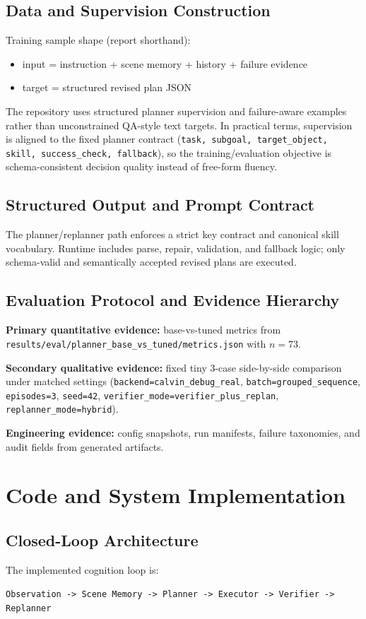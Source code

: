 \documentclass{article}
\begin{document}
\subsection{Data and Supervision Construction}
Training sample shape (report shorthand):
\begin{itemize}[leftmargin=*]
  \item input = instruction + scene memory + history + failure evidence
  \item target = structured revised plan JSON
\end{itemize}
The repository uses structured planner supervision and failure-aware examples rather than unconstrained QA-style text targets. In practical terms, supervision is aligned to the fixed planner contract (\texttt{task, subgoal, target\_object, skill, success\_check, fallback}), so the training/evaluation objective is schema-consistent decision quality instead of free-form fluency.

\subsection{Structured Output and Prompt Contract}
The planner/replanner path enforces a strict key contract and canonical skill vocabulary. Runtime includes parse, repair, validation, and fallback logic; only schema-valid and semantically accepted revised plans are executed.

\subsection{Evaluation Protocol and Evidence Hierarchy}
\textbf{Primary quantitative evidence:} base-vs-tuned metrics from \texttt{results/eval/planner\_base\_vs\_tuned/metrics.json} with $n=73$.

\textbf{Secondary qualitative evidence:} fixed tiny 3-case side-by-side comparison under matched settings (\texttt{backend=calvin\_debug\_real}, \texttt{batch=grouped\_sequence}, \texttt{episodes=3}, \texttt{seed=42}, \texttt{verifier\_mode=verifier\_plus\_replan}, \texttt{replanner\_mode=hybrid}).

\textbf{Engineering evidence:} config snapshots, run manifests, failure taxonomies, and audit fields from generated artifacts.

\section{Code and System Implementation}
\subsection{Closed-Loop Architecture}
The implemented cognition loop is:
\begin{center}
\texttt{Observation -> Scene Memory -> Planner -> Executor -> Verifier -> Replanner}
\end{center}
\end{document}
